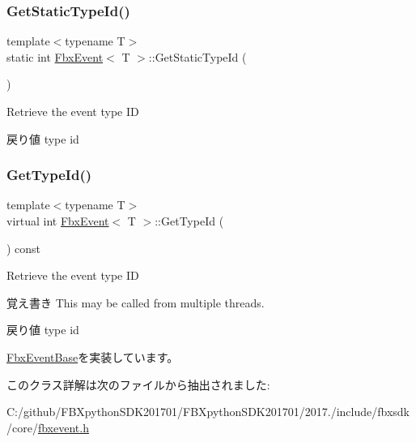 \subsubsection{\texorpdfstring{Get\+Static\+Type\+Id()}{GetStaticTypeId()}}
{\footnotesize\ttfamily template$<$typename T$>$ \\
static int \hyperlink{class_fbx_event}{Fbx\+Event}$<$ T $>$\+::Get\+Static\+Type\+Id (\begin{DoxyParamCaption}{ }\end{DoxyParamCaption})\hspace{0.3cm}{\ttfamily [static]}}

Retrieve the event type ID \begin{DoxyReturn}{戻り値}
type id 
\end{DoxyReturn}
\mbox{\label{class_fbx_event_a96ae7ea5ee46f040f6493f6acecd5bba}} 
\subsubsection{\texorpdfstring{Get\+Type\+Id()}{GetTypeId()}}
{\footnotesize\ttfamily template$<$typename T$>$ \\
virtual int \hyperlink{class_fbx_event}{Fbx\+Event}$<$ T $>$\+::Get\+Type\+Id (\begin{DoxyParamCaption}{ }\end{DoxyParamCaption}) const\hspace{0.3cm}{\ttfamily [virtual]}}

Retrieve the event type ID \begin{DoxyNote}{覚え書き}
This may be called from multiple threads. 
\end{DoxyNote}
\begin{DoxyReturn}{戻り値}
type id 
\end{DoxyReturn}


\hyperlink{class_fbx_event_base_ac7a558ec38bc899bd705786620582b8b}{Fbx\+Event\+Base}を実装しています。



このクラス詳解は次のファイルから抽出されました\+:\begin{DoxyCompactItemize}
\item 
C\+:/github/\+F\+B\+Xpython\+S\+D\+K201701/\+F\+B\+Xpython\+S\+D\+K201701/2017./include/fbxsdk/core/\hyperlink{fbxevent_8h}{fbxevent.\+h}\end{DoxyCompactItemize}

